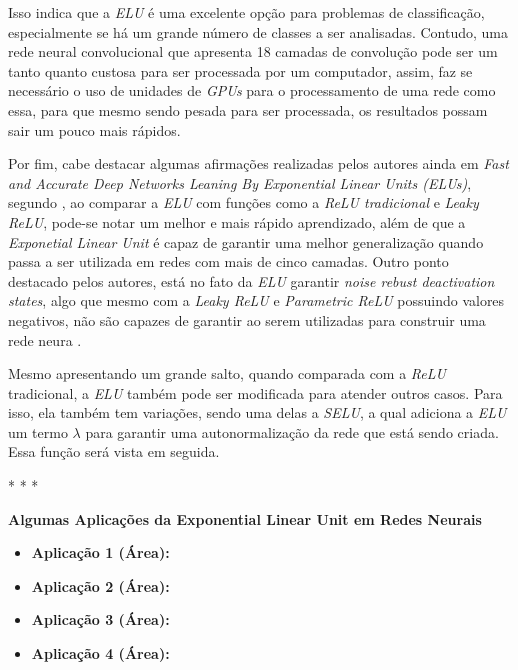 Isso indica que a \textit{ELU} é uma excelente opção para problemas de classificação, especialmente se há um grande número de classes a ser analisadas. Contudo, uma rede neural convolucional que apresenta 18 camadas de convolução pode ser um tanto quanto custosa para ser processada por um computador, assim, faz se necessário o uso de unidades de \textit{GPUs} para o processamento de uma rede como essa, para que mesmo sendo pesada para ser processada, os resultados possam sair um pouco mais rápidos.

Por fim, cabe destacar algumas afirmações realizadas pelos autores ainda em \textit{Fast and Accurate Deep Networks Leaning By Exponential Linear Units (ELUs)}, segundo \textcite{ELUArticle}, ao comparar a \textit{ELU} com funções como a \textit{ReLU tradicional} e \textit{Leaky ReLU}, pode-se notar um melhor e mais rápido aprendizado, além de que a \textit{Exponetial Linear Unit} é capaz de garantir uma melhor generalização quando passa a ser utilizada em redes com mais de cinco camadas. Outro ponto destacado pelos autores, está no fato da \textit{ELU} garantir \textit{noise rebust deactivation states}, algo que mesmo com a \textit{Leaky ReLU} e \textit{Parametric ReLU} possuindo valores negativos, não são capazes de garantir ao serem utilizadas para construir uma rede neura \parencite{ELUArticle}.

Mesmo apresentando um grande salto, quando comparada com a \textit{ReLU} tradicional, a \textit{ELU} também pode ser modificada para atender outros casos. Para isso, ela também tem variações, sendo uma delas a \textit{SELU}, a qual adiciona a \textit{ELU} um termo $\lambda$ para garantir uma autonormalização da rede que está sendo criada. Essa função será vista em seguida.

\medskip
\begin{center}
 * * *
\end{center}
\medskip

\textbf{Algumas Aplicações da Exponential Linear Unit em Redes Neurais}
\vspace{1em}

\begin{itemize}
    \item \textbf{Aplicação 1 (Área):}
    \item \textbf{Aplicação 2 (Área):}
    \item \textbf{Aplicação 3 (Área):}
    \item \textbf{Aplicação 4 (Área):}
\end{itemize}

